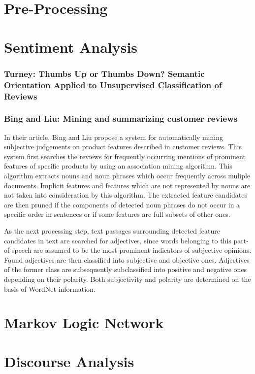 \documentclass[a4paper,11pt]{article}
\begin{document}
\section{Pre-Processing}

\section{Sentiment Analysis}
\subsubsection{Turney: Thumbs Up or Thumbs Down? Semantic Orientation Applied to
               Unsupervised Classification of Reviews\cite{Turney02}}

\subsubsection{Bing and Liu: Mining and summarizing customer reviews\cite{Bing-Liu-04}}
In their article, Bing and Liu \cite{Bing-Liu-04} propose a system for
automatically mining subjective judgements on product features described in
customer reviews.  This system first searches the reviews for frequently
occurring mentions of prominent features of specific products by using an
association mining algorithm.  This algorithm extracts nouns and noun phrases
which occur frequently across muliple documents.  Implicit features and
features which are not represented by nouns are not taken into consideration
by this algorithm.  The extracted feature candidates are then pruned if the
components of detected noun phrases do not occur in a specific order in
sentences or if some features are full subsets of other ones.

As the next processing step, text passages surrounding detected feature
candidates in text are searched for adjectives, since words belonging to this
part-of-speech are assumed to be the most prominent indicators of subjective
opinions.  Found adjectives are then classified into subjective and objective
ones.  Adjectives of the former class are subsequently subclassified into
positive and negative ones depending on their polarity.  Both subjectivity and
polarity are determined on the basis of WordNet information.

\section{Markov Logic Network}

\section{Discourse Analysis}

\nocite{*}

\end{document}
